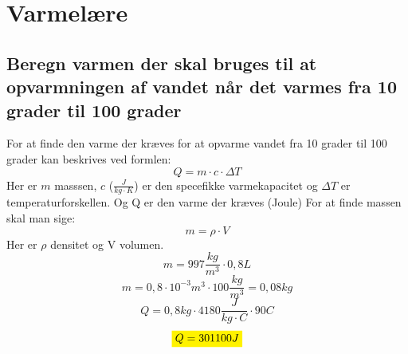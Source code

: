 \section{Varmelære}
\subsection{Beregn varmen der skal bruges til at opvarmningen af vandet når det varmes fra 10 grader til 100 grader}
For at finde den varme der kræves for at opvarme vandet fra 10 grader til 100 grader kan beskrives ved formlen: 
\begin{equation*}
    Q=m \cdot c \cdot \Delta T
\end{equation*}
Her er \begin{math}m\end{math} masssen, \begin{math}c\end{math} (\begin{math}
    \frac{J}{kg \cdot K}
\end{math}) er den specefikke varmekapacitet og $\Delta T$ er temperaturforskellen. Og Q er den varme der kræves (Joule)
For at finde massen skal man sige: 
\begin{equation*}
    m=\rho \cdot V
\end{equation*}
Her er $\rho$ densitet og V volumen.
\begin{equation*}
    m=997 \frac{kg}{m^3} \cdot 0,8 L
\end{equation*}
\begin{equation*}
    m=0,8 \cdot 10^{-3} m^3  \cdot 100 \frac{kg}{m^3}=0,08 kg
\end{equation*}
\begin{equation*}
    Q=0,8 kg \cdot 4180 \frac{J}{kg \cdot C} \cdot 90C
\end{equation*}
\begin{equation*}
    \mathcolorbox{yellow}{Q=301100 J}
\end{equation*}
